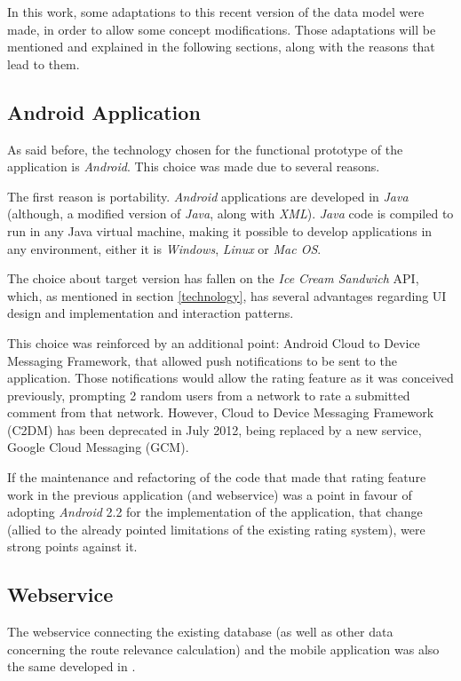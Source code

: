 In this work, some adaptations to this recent version of the data model were made, in order to allow some concept modifications. Those adaptations will be mentioned and explained in the following sections, along with the reasons that lead to them.

\subsection{Android Application}

As said before, the technology chosen for the functional prototype of the application is \emph{Android}. This choice was made due to several reasons. 

The first reason is portability. \emph{Android} applications are developed in \emph{Java} (although, a modified version of \emph{Java}, along with \emph{XML}). \emph{Java} code is compiled to run in any Java virtual machine, making it possible to develop applications in any environment, either it is \emph{Windows}, \emph{Linux} or \emph{Mac OS}.

The choice about target version has fallen on the \emph{Ice Cream Sandwich} API, which, as mentioned in section \ref{technology}, has several advantages regarding UI design and implementation and interaction patterns. 

This choice was reinforced by an additional point: Android Cloud to Device Messaging Framework, that allowed push notifications to be sent to the application. Those notifications would allow the rating feature as it was conceived previously, prompting 2 random users from a network to rate a submitted comment from that network. However, Cloud to Device Messaging Framework (C2DM) has been deprecated in July 2012, being replaced by a new service, Google Cloud Messaging (GCM).

If the maintenance and refactoring of the code that made that rating feature work in the previous application (and webservice) was a point in favour of adopting \emph{Android} 2.2 for the implementation of the application, that change (allied to the already pointed limitations of the existing rating system), were strong points against it.

\subsection{Webservice}

The webservice connecting the existing database (as well as other data concerning the route relevance calculation) and the mobile application was also the same developed in \cite{kn:eSG12}.

